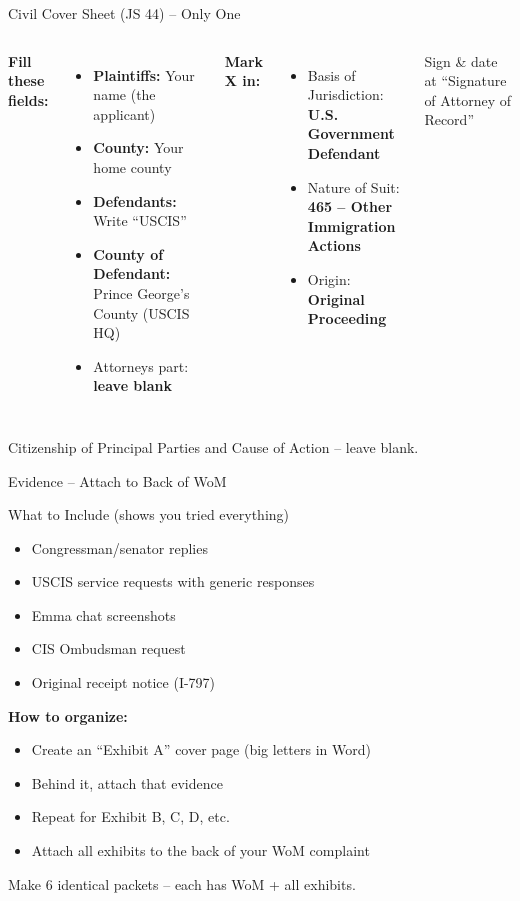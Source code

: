 \documentclass[10pt,aspectratio=169]{beamer}
\begin{document}
	\begin{frame}{Civil Cover Sheet (JS 44) – Only One}
		\begin{columns}[T]
			\textbf{Fill these fields:}
			\begin{itemize}
				\item \textbf{Plaintiffs:} Your name (the applicant)
				\item \textbf{County:} Your home county
				\item \textbf{Defendants:} Write “USCIS”
				\item \textbf{County of Defendant:} Prince George’s County (USCIS HQ)
				\item Attorneys part: \textbf{leave blank}
			\end{itemize}
			\textbf{Mark X in:}
			\begin{itemize}
				\item Basis of Jurisdiction: \textbf{U.S. Government Defendant}
				\item Nature of Suit: \textbf{465 – Other Immigration Actions}
				\item Origin: \textbf{Original Proceeding}
			\end{itemize}
			Sign \& date at “Signature of Attorney of Record”
		\end{columns}
		\vspace{0.2cm}
		\tiny Citizenship of Principal Parties and Cause of Action – leave blank.
	\end{frame}
	
	\begin{frame}{Evidence – Attach to Back of WoM}
		\begin{block}{What to Include (shows you tried everything)}
			\begin{itemize}
				\item Congressman/senator replies
				\item USCIS service requests with generic responses
				\item Emma chat screenshots
				\item CIS Ombudsman request
				\item Original receipt notice (I-797)
			\end{itemize}
		\end{block}
		\textbf{How to organize:}
		\begin{itemize}
			\item Create an “Exhibit A” cover page (big letters in Word)
			\item Behind it, attach that evidence
			\item Repeat for Exhibit B, C, D, etc.
			\item Attach all exhibits to the back of your WoM complaint
		\end{itemize}
		\textcolor{titleblue}{Make 6 identical packets – each has WoM + all exhibits.}
	\end{frame}
	
\end{document}

